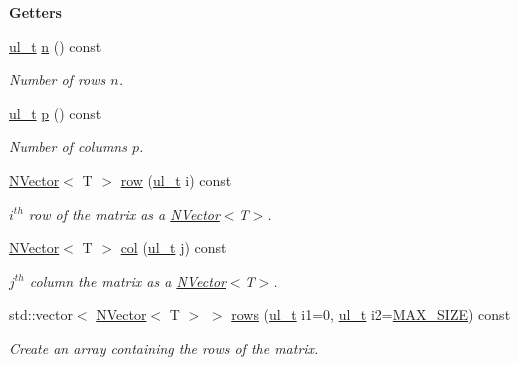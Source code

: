 \begin{Indent}\textbf{ Getters}\par
\begin{DoxyCompactItemize}
\item 
\mbox{\hyperlink{group___n_algebra_ga1b140a2034db3f5dfe18a987745df43a}{ul\+\_\+t}} \mbox{\hyperlink{class_n_p_matrix_afc181b7652d9427125c72c38d7c1498d}{n}} () const
\begin{DoxyCompactList}\small\item\em Number of rows $ n $. \end{DoxyCompactList}\item 
\mbox{\hyperlink{group___n_algebra_ga1b140a2034db3f5dfe18a987745df43a}{ul\+\_\+t}} \mbox{\hyperlink{class_n_p_matrix_a3beee8acb5babf62d2b4f212ac5d18e8}{p}} () const
\begin{DoxyCompactList}\small\item\em Number of columns $ p $. \end{DoxyCompactList}\item 
\mbox{\hyperlink{class_n_vector}{N\+Vector}}$<$ T $>$ \mbox{\hyperlink{class_n_p_matrix_a99ae2d8850ecdb33fbd9a71804ab4ea7}{row}} (\mbox{\hyperlink{group___n_algebra_ga1b140a2034db3f5dfe18a987745df43a}{ul\+\_\+t}} i) const
\begin{DoxyCompactList}\small\item\em $ i^{th} $ row of the matrix as a {\ttfamily \mbox{\hyperlink{class_n_vector}{N\+Vector}}$<$T$>$}. \end{DoxyCompactList}\item 
\mbox{\hyperlink{class_n_vector}{N\+Vector}}$<$ T $>$ \mbox{\hyperlink{class_n_p_matrix_aa137db97da518f1dfb69e7eb8fa1b94d}{col}} (\mbox{\hyperlink{group___n_algebra_ga1b140a2034db3f5dfe18a987745df43a}{ul\+\_\+t}} j) const
\begin{DoxyCompactList}\small\item\em $ j^{th} $ column the matrix as a {\ttfamily \mbox{\hyperlink{class_n_vector}{N\+Vector}}$<$T$>$}. \end{DoxyCompactList}\item 
std\+::vector$<$ \mbox{\hyperlink{class_n_vector}{N\+Vector}}$<$ T $>$ $>$ \mbox{\hyperlink{class_n_p_matrix_add861e9e1df81af2546c3eab1fd40d51}{rows}} (\mbox{\hyperlink{group___n_algebra_ga1b140a2034db3f5dfe18a987745df43a}{ul\+\_\+t}} i1=0, \mbox{\hyperlink{group___n_algebra_ga1b140a2034db3f5dfe18a987745df43a}{ul\+\_\+t}} i2=\mbox{\hyperlink{_n_vector_8h_a0592dba56693fad79136250c11e5a7fe}{M\+A\+X\+\_\+\+S\+I\+ZE}}) const
\begin{DoxyCompactList}\small\item\em Create an array containing the rows of the matrix. \end{DoxyCompactList}\item 

\end{DoxyCompactItemize}
\end{Indent}

